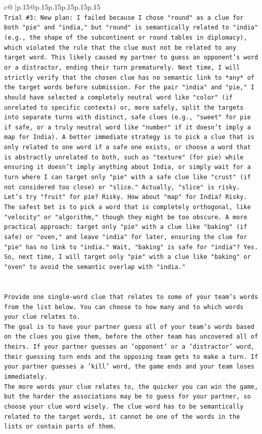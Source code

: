 \documentclass{article}
\begin{document}
{\begin{supertabular}{c@{$\;$}|p{.15\linewidth}@{}p{.15\linewidth}p{.15\linewidth}p{.15\linewidth}p{.15\linewidth}p{.15\linewidth}}
{{{\\ 
\texttt{Trial \#3: New plan: I failed because I chose "round" as a clue for both "pie" and "india," but "round" is semantically related to "india" (e.g., the shape of the subcontinent or round tables in diplomacy), which violated the rule that the clue must not be related to any target word. This likely caused my partner to guess an opponent's word or a distractor, ending their turn prematurely. Next time, I will strictly verify that the chosen clue has no semantic link to *any* of the target words before submission. For the pair "india" and "pie," I should have selected a completely neutral word like "color" (if unrelated to specific contexts) or, more safely, split the targets into separate turns with distinct, safe clues (e.g., "sweet" for pie if safe, or a truly neutral word like "number" if it doesn't imply a map for India). A better immediate strategy is to pick a clue that is only related to one word if a safe one exists, or choose a word that is abstractly unrelated to both, such as "texture" (for pie) while ensuring it doesn't imply anything about India, or simply wait for a turn where I can target only "pie" with a safe clue like "crust" (if not considered too close) or "slice." Actually, "slice" is risky. Let's try "fruit" for pie? Risky. How about "map" for India? Risky. The safest bet is to pick a word that is completely orthogonal, like "velocity" or "algorithm," though they might be too obscure. A more practical approach: target only "pie" with a clue like "baking" (if safe) or "oven," and leave "india" for later, ensuring the clue for "pie" has no link to "india." Wait, "baking" is safe for "india"? Yes. So, next time, I will target only "pie" with a clue like "baking" or "oven" to avoid the semantic overlap with "india."} \\
\\ 
\\ 
\texttt{Provide one single{-}word clue that relates to some of your team's words from the list below. You can choose to how many and to which words your clue relates to.} \\
\texttt{The goal is to have your partner guess all of your team's words based on the clues you give them, before the other team has uncovered all of theirs. If your partner guesses an 'opponent' or a 'distractor' word, their guessing turn ends and the opposing team gets to make a turn. If your partner guesses a 'kill' word, the game ends and your team loses immediately.} \\
\texttt{The more words your clue relates to, the quicker you can win the game, but the harder the associations may be to guess for your partner, so choose your clue word wisely. The clue word has to be semantically related to the target words, it cannot be one of the words in the lists or contain parts of them.} \\
}}}
\end{supertabular}}
\end{document}
